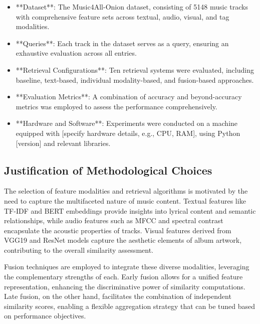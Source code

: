 \documentclass[sigconf]{acmart}
\begin{document}
\begin{itemize}
    \item **Dataset**: The Music4All-Onion dataset, consisting of 5148 music tracks with comprehensive feature sets across textual, audio, visual, and tag modalities.
    
    \item **Queries**: Each track in the dataset serves as a query, ensuring an exhaustive evaluation across all entries.
    
    \item **Retrieval Configurations**: Ten retrieval systems were evaluated, including baseline, text-based, individual modality-based, and fusion-based approaches.
    
    \item **Evaluation Metrics**: A combination of accuracy and beyond-accuracy metrics was employed to assess the performance comprehensively.
    
    \item **Hardware and Software**: Experiments were conducted on a machine equipped with [specify hardware details, e.g., CPU, RAM], using Python [version] and relevant libraries.
\end{itemize}

\subsection{Justification of Methodological Choices}
\label{subsec:methodological_justification}

The selection of feature modalities and retrieval algorithms is motivated by the need to capture the multifaceted nature of music content. Textual features like TF-IDF and BERT embeddings provide insights into lyrical content and semantic relationships, while audio features such as MFCC and spectral contrast encapsulate the acoustic properties of tracks. Visual features derived from VGG19 and ResNet models capture the aesthetic elements of album artwork, contributing to the overall similarity assessment.

Fusion techniques are employed to integrate these diverse modalities, leveraging the complementary strengths of each. Early fusion allows for a unified feature representation, enhancing the discriminative power of similarity computations. Late fusion, on the other hand, facilitates the combination of independent similarity scores, enabling a flexible aggregation strategy that can be tuned based on performance objectives.
\end{document}
